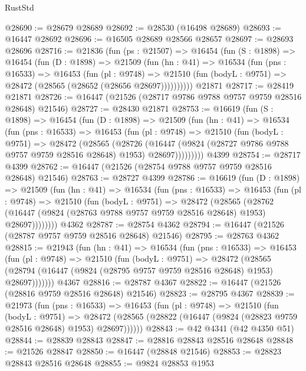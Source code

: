 \begin{lexlean}{RustStd}
\begin{coremodule}
@28690 := @28679 @28689
@28692 := @28530 (@16498 @28689)
@28693 := @16447 @28692
@28696 := @16505 @28689 @28566 @28657
@28697 := @28693 @28696
@28716 := @21836
    (fun (ps : @21507) =>
    @16454
      (fun (S : @1898) =>
      @16454
        (fun (D : @1898) =>
        @21509
          (fun (hn : @41) =>
          @16534
            (fun (pns : @16533) =>
            @16453
              (fun (pl : @9748) =>
              @21510 (fun (bodyL : @9751) => @28472 (@28565 (@28652 (@28656 @28697))))))))))
    @21871
@28717 := @28419 @21871
@28726 := @16447 (@21526 (@28717 @9786 @9788 @9757 @9759 @28516 @28648) @21546)
@28727 := @28430 @21871
@28753 := @16619
    (fun (S : @1898) =>
    @16454
      (fun (D : @1898) =>
      @21509
        (fun (hn : @41) =>
        @16534
          (fun (pns : @16533) =>
          @16453
            (fun (pl : @9748) =>
            @21510
              (fun (bodyL : @9751) =>
              @28472
                (@28565
                  (@28726
                    (@16447
                      (@9824 (@28727 @9786 @9788 @9757 @9759 @28516 @28648) @1953)
                      @28697)))))))))
    @4399
@28754 := @28717 @4399
@28762 := @16447 (@21526 (@28754 @9788 @9757 @9759 @28516 @28648) @21546)
@28763 := @28727 @4399
@28786 := @16619
    (fun (D : @1898) =>
    @21509
      (fun (hn : @41) =>
      @16534
        (fun (pns : @16533) =>
        @16453
          (fun (pl : @9748) =>
          @21510
            (fun (bodyL : @9751) =>
            @28472
              (@28565
                (@28762
                  (@16447 (@9824 (@28763 @9788 @9757 @9759 @28516 @28648) @1953) @28697))))))))
    @4362
@28787 := @28754 @4362
@28794 := @16447 (@21526 (@28787 @9757 @9759 @28516 @28648) @21546)
@28795 := @28763 @4362
@28815 := @21943
    (fun (hn : @41) =>
    @16534
      (fun (pns : @16533) =>
      @16453
        (fun (pl : @9748) =>
        @21510
          (fun (bodyL : @9751) =>
          @28472
            (@28565 (@28794 (@16447 (@9824 (@28795 @9757 @9759 @28516 @28648) @1953) @28697)))))))
    @4367
@28816 := @28787 @4367
@28822 := @16447 (@21526 (@28816 @9759 @28516 @28648) @21546)
@28823 := @28795 @4367
@28839 := @21973
    (fun (pns : @16533) =>
    @16453
      (fun (pl : @9748) =>
      @21510
        (fun (bodyL : @9751) =>
        @28472 (@28565 (@28822 (@16447 (@9824 (@28823 @9759 @28516 @28648) @1953) @28697))))))
@28843 := @42 @4341 (@42 @4350 @51)
@28844 := @28839 @28843
@28847 := @28816 @28843 @28516 @28648
@28848 := @21526 @28847
@28850 := @16447 (@28848 @21546)
@28853 := @28823 @28843 @28516 @28648
@28855 := @9824 @28853 @1953

\end{coremodule}
\end{lexlean}
